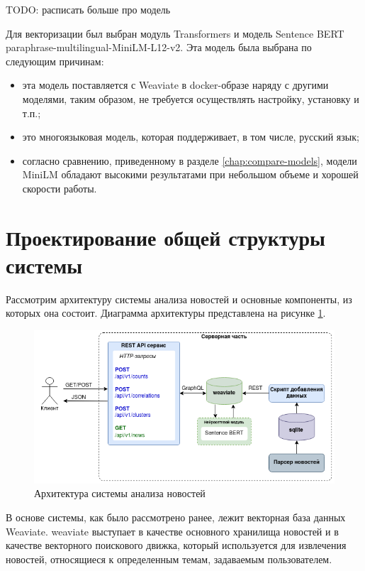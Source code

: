 TODO: расписать больше про модель

Для векторизации был выбран модуль Transformers и модель Sentence BERT paraphrase-multilingual-MiniLM-L12-v2. Эта модель была выбрана по следующим причинам:
\begin{itemize}
    \item эта модель поставляется с Weaviate в docker-образе наряду с другими моделями, таким образом, не требуется осуществлять настройку, установку и т.п.;
    \item это многоязыковая модель, которая поддерживает, в том числе, русский язык;
    \item согласно сравнению, приведенному в разделе \ref{chap:compare-models}, модели MiniLM обладают высокими результатами при небольшом объеме и хорошей скорости работы.
\end{itemize}

\section{Проектирование общей структуры системы}

Рассмотрим архитектуру системы анализа новостей и основные компоненты, из которых она состоит. Диаграмма архитектуры представлена на рисунке \ref{img:system-architecture}.

\begin{figure}[h]
    \centering
    \includegraphics[width=\linewidth]{images/system-architecture.png}
    \caption{Архитектура системы анализа новостей}
    \label{img:system-architecture}
\end{figure}

В основе системы, как было рассмотрено ранее, лежит векторная база данных Weaviate. weaviate выступает в качестве основного хранилища новостей и в качестве векторного поискового движка, который используется для извлечения новостей, относящиеся к определенным темам, задаваемым пользователем.

